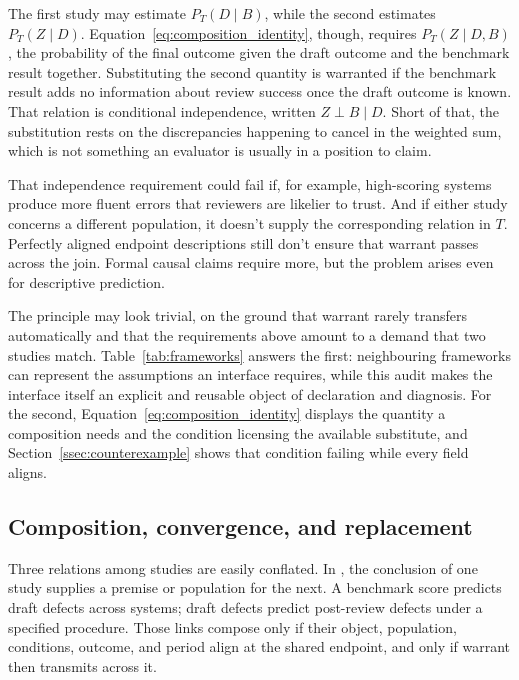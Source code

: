 \documentclass[12pt]{article}
\begin{document}
The first study may estimate \(P_T(D\mid B)\), while the second estimates \(P_T(Z\mid D)\). Equation~\ref{eq:composition_identity}, though, requires \(P_T(Z\mid D,B)\), the probability of the final outcome given the draft outcome and the benchmark result together. Substituting the second quantity is warranted if the benchmark result adds no information about review success once the draft outcome is known. That relation is conditional independence, written \(Z\perp B\mid D\). Short of that, the substitution rests on the discrepancies happening to cancel in the weighted sum, which is not something an evaluator is usually in a position to claim.

That independence requirement could fail if, for example, high-scoring systems produce more fluent errors that reviewers are likelier to trust. And if either study concerns a different population, it doesn't supply the corresponding relation in \(T\). Perfectly aligned endpoint descriptions still don't ensure that warrant passes across the join. Formal causal claims require more, but the problem arises even for descriptive prediction.

The principle may look trivial, on the ground that warrant rarely transfers automatically and that the requirements above amount to a demand that two studies match. Table~\ref{tab:frameworks} answers the first: neighbouring frameworks can represent the assumptions an interface requires, while this audit makes the interface itself an explicit and reusable object of declaration and diagnosis. For the second, Equation~\ref{eq:composition_identity} displays the quantity a composition needs and the condition licensing the available substitute, and Section~\ref{ssec:counterexample} shows that condition failing while every field aligns.

\subsection{Composition, convergence, and replacement}\label{ssec:relations}

Three relations among studies are easily conflated. In , the conclusion of one study supplies a premise or population for the next. A benchmark score predicts draft defects across systems; draft defects predict post-review defects under a specified procedure. Those links compose only if their object, population, conditions, outcome, and period align at the shared endpoint, and only if warrant then transmits across it.
\end{document}
